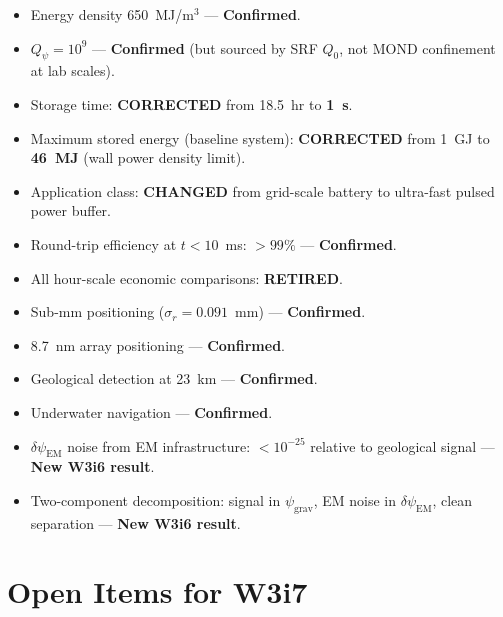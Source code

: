 \documentclass[11pt]{article}
\theoremstyle{definition}
\theoremstyle{remark}
\newcommand{\Qpsi}{Q_\psi}
\newcommand{\psigrav}{\psi_{\mathrm{grav}}}
\newcommand{\dpsiem}{\delta\psi_{\mathrm{EM}}}
\begin{document}
\begin{tcolorbox}[colback=orange!5!white, colframe=orange!60!black,
  title=\textbf{P7 (Energy Storage): Fundamentally Revised}]
\begin{itemize}[nosep]
\item Energy density 650~MJ/m$^3$ --- \textbf{Confirmed}.
\item $\Qpsi = 10^9$ --- \textbf{Confirmed} (but sourced by SRF $Q_0$,
  not MOND confinement at lab scales).
\item Storage time: \textbf{CORRECTED} from 18.5~hr to \textbf{1~s}.
\item Maximum stored energy (baseline system): \textbf{CORRECTED} from
  1~GJ to \textbf{46~MJ} (wall power density limit).
\item Application class: \textbf{CHANGED} from grid-scale battery to
  ultra-fast pulsed power buffer.
\item Round-trip efficiency at $t < 10$~ms: $> 99\%$ --- \textbf{Confirmed}.
\item All hour-scale economic comparisons: \textbf{RETIRED}.
\end{itemize}
\end{tcolorbox}

\begin{tcolorbox}[colback=green!5!white, colframe=green!40!black,
  title=\textbf{P9 (Navigation): All Claims Confirmed}]
\begin{itemize}[nosep]
\item Sub-mm positioning ($\sigma_r = 0.091$~mm) --- \textbf{Confirmed}.
\item 8.7~nm array positioning --- \textbf{Confirmed}.
\item Geological detection at 23~km --- \textbf{Confirmed}.
\item Underwater navigation --- \textbf{Confirmed}.
\item $\dpsiem$ noise from EM infrastructure: $< 10^{-25}$ relative to
  geological signal --- \textbf{New W3i6 result}.
\item Two-component decomposition: signal in $\psigrav$, EM noise in
  $\dpsiem$, clean separation --- \textbf{New W3i6 result}.
\end{itemize}
\end{tcolorbox}

\section{Open Items for W3i7}
\label{sec:open}
\end{document}
